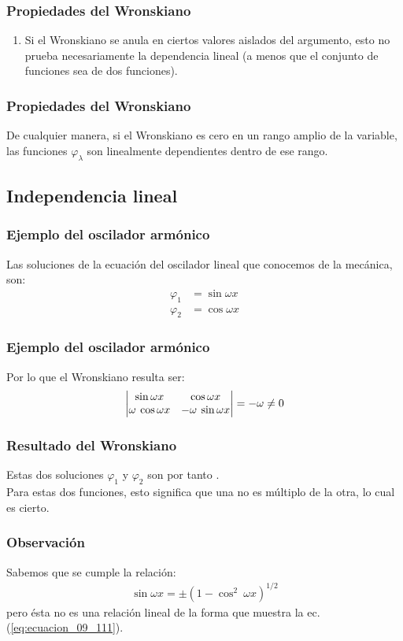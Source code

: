 \documentclass[12pt]{beamer}
\begin{document}
\begin{frame}
\frametitle{Propiedades del Wronskiano}
\begin{enumerate}
\conti
\item Si el Wronskiano se anula en ciertos valores aislados del argumento, esto no prueba necesariamente la dependencia lineal (a menos que el conjunto de funciones sea de dos funciones).
\end{enumerate}
\end{frame}
\begin{frame}
\frametitle{Propiedades del Wronskiano}
De cualquier manera, si el Wronskiano es cero en un rango amplio de la variable, las funciones $\varphi_{\lambda}$ son linealmente dependientes dentro de ese rango.
\end{frame}

\subsection{Independencia lineal}

\begin{frame}
\frametitle{Ejemplo del oscilador armónico}
Las soluciones de la ecuación del oscilador lineal que conocemos de la mecánica, son:
\pause
\begin{align*}
\varphi_{1} &= \sin \omega x \\[0.5em]
\varphi_{2} &= \cos \omega x
\end{align*}
\end{frame}
\begin{frame}
\frametitle{Ejemplo del oscilador armónico}
Por lo que el Wronskiano resulta ser:
\pause
\begin{align*}
\mdet{
\sin \omega x & \cos \omega x \\
\omega \: \cos \omega x & - \omega \: \sin \omega x
} = -\omega \neq 0
\end{align*}
\end{frame}
\begin{frame}
\frametitle{Resultado del Wronskiano}
 Estas dos soluciones $\varphi_{1}$ y $\varphi_{2}$ son por tanto .
 \\
 \bigskip
 \pause
 Para estas dos funciones, esto significa que una no es múltiplo de la otra, lo cual es cierto.
\end{frame}
\begin{frame}
\frametitle{Observación}
Sabemos que se cumple la relación:
\pause
\begin{align*}
\sin \omega x = \pm (1 - \cos^{2} \: \omega x)^{1/2}
\end{align*}
pero ésta no es una relación lineal de la forma que muestra la ec. (\ref{eq:ecuacion_09_111}).
\end{frame}
\end{document}
